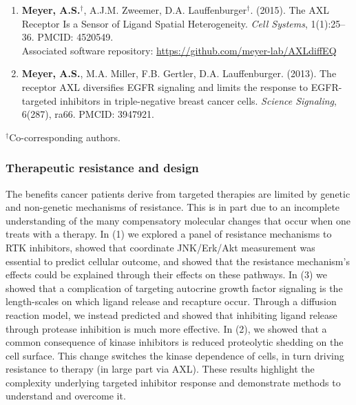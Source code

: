 \documentclass[11pt]{article}
\begin{document}
\begin{enumerate}
  \item \textbf{Meyer, A.S.}$^\dag$, A.J.M. Zweemer, D.A. Lauffenburger$^\dag$. (2015). The AXL Receptor Is a Sensor of Ligand Spatial Heterogeneity. \emph{Cell Systems}, 1(1):25--36. PMCID: 4520549.\\ Associated software repository: \url{https://github.com/meyer-lab/AXLdiffEQ}
  \item \textbf{Meyer, A.S.}, M.A. Miller, F.B. Gertler, D.A. Lauffenburger. (2013). The receptor AXL diversifies EGFR signaling and limits the response to EGFR-targeted inhibitors in triple-negative breast cancer cells. \emph{Science Signaling}, 6(287), ra66. PMCID: 3947921.
\end{enumerate}

\noindent $^\dag$Co-corresponding authors.






\subsubsection{Therapeutic resistance and design} %

The benefits cancer patients derive from targeted therapies are limited by genetic and non-genetic mechanisms of resistance. This is in part due to an incomplete understanding of the many compensatory molecular changes that occur when one treats with a therapy. In (1) we explored a panel of resistance mechanisms to RTK inhibitors, showed that coordinate JNK/Erk/Akt measurement was essential to predict cellular outcome, and showed that the resistance mechanism's effects could be explained through their effects on these pathways. In (3) we showed that a complication of targeting autocrine growth factor signaling is the length-scales on which ligand release and recapture occur. Through a diffusion reaction model, we instead predicted and showed that inhibiting ligand release through protease inhibition is much more effective. In (2), we showed that a common consequence of kinase inhibitors is reduced proteolytic shedding on the cell surface. This change switches the kinase dependence of cells, in turn driving resistance to therapy (in large part via AXL). These results highlight the complexity underlying targeted inhibitor response and demonstrate methods to understand and overcome it.
\end{document}
